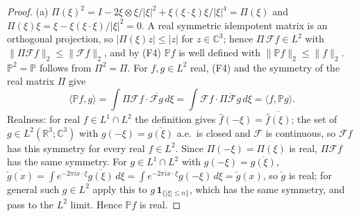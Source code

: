 \documentclass[11pt]{article}
\theoremstyle{definition}
\theoremstyle{plain}
\newcommand{\R}{\mathbb R}
\newcommand{\norm}[1]{\lVert #1\rVert}
\begin{document}
\begin{proof}
(a) $\Pi(\xi)^2=I-2\xi\otimes\xi/|\xi|^2+\xi(\xi\cdot\xi)\xi/|\xi|^4=\Pi(\xi)$
and $\Pi(\xi)\xi=\xi-\xi(\xi\cdot\xi)/|\xi|^2=0$.  A real symmetric
idempotent matrix is an orthogonal projection, so $|\Pi(\xi)z|\le|z|$ for
$z\in\mathbb C^3$; hence $\Pi\,\mathcal Ff\in L^2$ with
$\norm{\Pi\mathcal Ff}_2\le\norm{\mathcal Ff}_2$, and by (F4)
$\mathbb Pf$ is well defined with $\norm{\mathbb Pf}_2\le\norm f_2$.
$\mathbb P^2=\mathbb P$ follows from $\Pi^2=\Pi$.  For $f,g\in L^2$ real,
(F4) and the symmetry of the real matrix $\Pi$ give
\[
 \langle\mathbb Pf,g\rangle
 =\int\Pi\mathcal Ff\cdot\overline{\mathcal Fg}\,d\xi
 =\int\mathcal Ff\cdot\overline{\Pi\mathcal Fg}\,d\xi
 =\langle f,\mathbb Pg\rangle .
\]
Realness: for real $f\in L^1\cap L^2$ the definition gives
$\hat f(-\xi)=\overline{\hat f(\xi)}$; the set of $g\in L^2(\R^3;\mathbb C^3)$
with $g(-\xi)=\overline{g(\xi)}$ a.e.\ is closed and $\mathcal F$ is
continuous, so $\mathcal Ff$ has this symmetry for every real
$f\in L^2$.  Since $\Pi(-\xi)=\Pi(\xi)$ is real, $\Pi\mathcal Ff$ has the
same symmetry.  For $g\in L^1\cap L^2$ with $g(-\xi)=\overline{g(\xi)}$,
$\overline{\check g(x)}=\int e^{-2\pi ix\cdot\xi}\overline{g(\xi)}\,d\xi
=\int e^{-2\pi ix\cdot\xi}g(-\xi)\,d\xi=\check g(x)$, so $\check g$ is
real; for general such $g\in L^2$ apply this to
$g\,\mathbf 1_{\{|\xi|\le n\}}$, which has the same symmetry, and pass to
the $L^2$ limit.  Hence $\mathbb Pf$ is real.


\end{proof}
\end{document}
